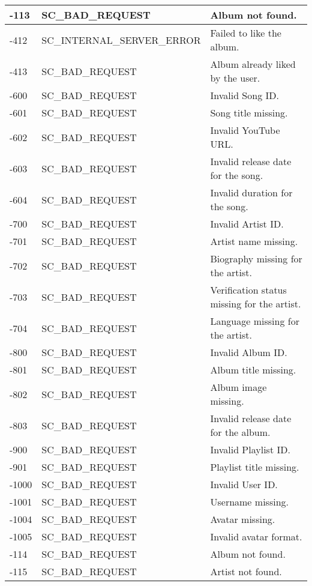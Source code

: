 \begin{longtable}{|p{}|p{} |p{}|}
        -113 & SC\_BAD\_REQUEST & Album not found. \\\hline
        -412 & SC\_INTERNAL\_SERVER\_ERROR & Failed to like the album. \\\hline
        -413 & SC\_BAD\_REQUEST & Album already liked by the user. \\\hline
        -600 & SC\_BAD\_REQUEST & Invalid Song ID. \\\hline
        -601 & SC\_BAD\_REQUEST & Song title missing. \\\hline
        -602 & SC\_BAD\_REQUEST & Invalid YouTube URL. \\\hline
        -603 & SC\_BAD\_REQUEST & Invalid release date for the song. \\\hline
        -604 & SC\_BAD\_REQUEST & Invalid duration for the song. \\\hline
        -700 & SC\_BAD\_REQUEST & Invalid Artist ID. \\\hline
        -701 & SC\_BAD\_REQUEST & Artist name missing. \\\hline
        -702 & SC\_BAD\_REQUEST & Biography missing for the artist. \\\hline
        -703 & SC\_BAD\_REQUEST & Verification status missing for the artist. \\\hline
        -704 & SC\_BAD\_REQUEST & Language missing for the artist. \\\hline
        -800 & SC\_BAD\_REQUEST & Invalid Album ID. \\\hline
        -801 & SC\_BAD\_REQUEST & Album title missing. \\\hline
        -802 & SC\_BAD\_REQUEST & Album image missing. \\\hline
        -803 & SC\_BAD\_REQUEST & Invalid release date for the album. \\\hline
        -900 & SC\_BAD\_REQUEST & Invalid Playlist ID. \\\hline
        -901 & SC\_BAD\_REQUEST & Playlist title missing. \\\hline
        -1000 & SC\_BAD\_REQUEST & Invalid User ID. \\\hline
        -1001 & SC\_BAD\_REQUEST & Username missing. \\\hline
        -1004 & SC\_BAD\_REQUEST & Avatar missing. \\\hline
        -1005 & SC\_BAD\_REQUEST & Invalid avatar format. \\\hline
        -114 & SC\_BAD\_REQUEST & Album not found. \\\hline
        -115 & SC\_BAD\_REQUEST & Artist not found. \\\hline

\end{longtable}
